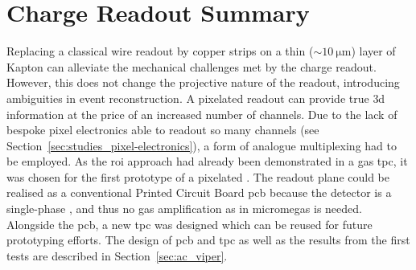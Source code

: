 \section{Charge Readout Summary}
\label{sec:studies_charge-ro-summary}

Replacing a classical wire readout by copper strips on a thin ($\sim \SI{10}{\micro\metre}$) layer of Kapton can alleviate the mechanical challenges met by the charge readout.
However, this does not change the projective nature of the readout, introducing ambiguities in event reconstruction.
A pixelated readout can provide true \gls{3d} information at the price of an increased number of channels.
Due to the lack of bespoke pixel electronics able to readout so many channels (see Section~\ref{sec:studies_pixel-electronics}), a form of analogue multiplexing had to be employed.
As the \gls{roi} approach had already been demonstrated in a gas \gls{tpc}, it was chosen for the first prototype of a pixelated \lartpc{}.
The readout plane could be realised as a conventional Printed Circuit Board \gls{pcb} because the detector is a single-phase \lartpc{}, and thus no gas amplification as in \gls{micromegas} is needed.
Alongside the \gls{pcb}, a new \gls{tpc} was designed which can be reused for future prototyping efforts.
The design of \gls{pcb} and \gls{tpc} as well as the results from the first tests are described in Section~\ref{sec:ac_viper}.